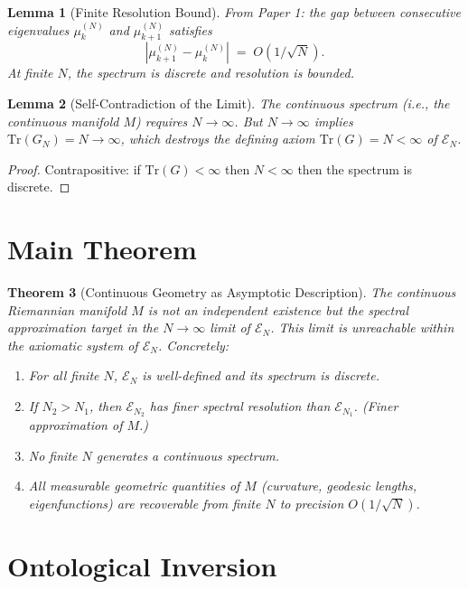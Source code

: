 \documentclass[11pt]{article}
\newtheorem{theorem}{Theorem}
\newtheorem{lemma}[theorem]{Lemma}
\begin{document}
\begin{lemma}[Finite Resolution Bound]\label{lem:resolution}
From Paper 1: the gap between consecutive eigenvalues
$\mu_k^{(N)}$ and $\mu_{k+1}^{(N)}$ satisfies
\[
  |\mu_{k+1}^{(N)} - \mu_k^{(N)}| \;=\; O(1/\sqrt{N}).
\]
At finite $N$, the spectrum is discrete and resolution is bounded.
\end{lemma}

\begin{lemma}[Self-Contradiction of the Limit]\label{lem:contradiction}
The continuous spectrum (i.e., the continuous manifold $M$)
requires $N \to \infty$. But $N \to \infty$ implies
$\mathrm{Tr}(G_N) = N \to \infty$, which destroys the
defining axiom $\mathrm{Tr}(G) = N < \infty$ of $\mathcal{E}_N$.
\end{lemma}

\begin{proof}
Contrapositive: if $\mathrm{Tr}(G) < \infty$ then $N < \infty$
then the spectrum is discrete.
\end{proof}

\section{Main Theorem}

\begin{theorem}[Continuous Geometry as Asymptotic Description]
\label{thm:asymptotic}
The continuous Riemannian manifold $M$ is not an independent
existence but the spectral approximation target in the
$N \to \infty$ limit of $\mathcal{E}_N$. This limit is
unreachable within the axiomatic system of $\mathcal{E}_N$.
Concretely:
\begin{enumerate}
  \item[(i)] For all finite $N$, $\mathcal{E}_N$ is well-defined
    and its spectrum is discrete.
  \item[(ii)] If $N_2 > N_1$, then $\mathcal{E}_{N_2}$ has finer
    spectral resolution than $\mathcal{E}_{N_1}$.
    (Finer approximation of $M$.)
  \item[(iii)] No finite $N$ generates a continuous spectrum.
  \item[(iv)] All measurable geometric quantities of $M$
    (curvature, geodesic lengths, eigenfunctions) are
    recoverable from finite $N$ to precision $O(1/\sqrt{N})$.
\end{enumerate}
\end{theorem}

\section{Ontological Inversion}
\end{document}
